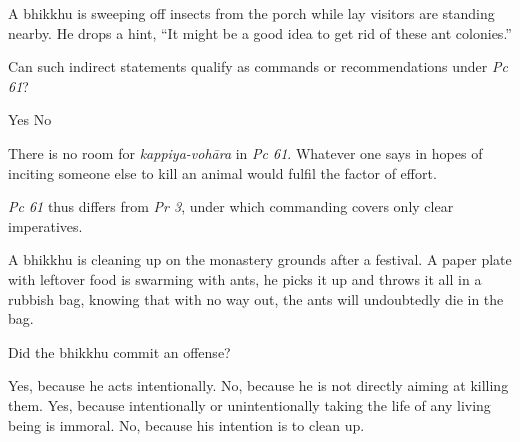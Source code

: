 \begin{exam}{\autoExamName}
\begin{problem}
\end{problem}

\problemDivide

\begin{problem}
  A bhikkhu is sweeping off insects from the porch while lay visitors are standing nearby.
  He drops a hint, ``It might be a good idea to get rid of these ant colonies.''

  Can such indirect statements qualify as commands or recommendations under \emph{Pc 61}?

  \bigskip

  \begin{answers}{2}
    \bChoices
     Yes\eAns
     No\eAns
    \eChoices
  \end{answers}

  \begin{solution}
    There is no room for \emph{kappiya-vohāra} in \emph{Pc 61}. Whatever one says in hopes of inciting someone else to kill an animal would fulfil the factor of effort.

    \emph{Pc 61} thus differs from \emph{Pr 3}, under which commanding covers only clear imperatives.
  \end{solution}

\end{problem}

\problemDivide

\begin{problem}

  A bhikkhu is cleaning up on the monastery grounds after a festival.
  A paper plate with leftover food is swarming with ants, he picks it up and throws it all in a rubbish bag,
  knowing that with no way out, the ants will undoubtedly die in the bag.

  Did the bhikkhu commit an offense?

\bigskip

\begin{manswers}{1}
    \bChoices
     Yes, because he acts intentionally. \eAns
     No, because he is not directly aiming at killing them. \eAns
     Yes, because intentionally or unintentionally taking the life of any living being is immoral. \eAns
     No, because his intention is to clean up. \eAns
    \eChoices
\end{manswers}

\end{problem}

\end{exam}

